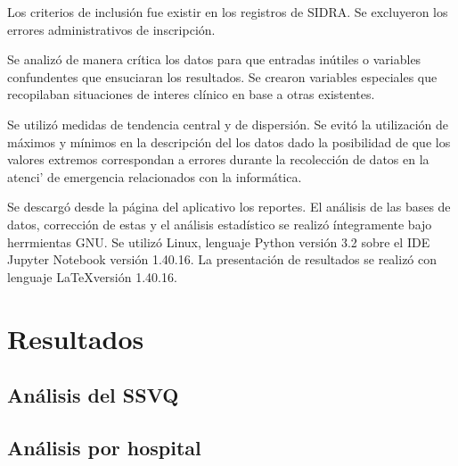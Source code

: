 \documentclass{article}
\begin{document}
Los criterios de inclusión fue existir en los registros de SIDRA. Se excluyeron los errores administrativos de inscripción.

Se analizó de manera crítica los datos para que entradas inútiles o variables confundentes que ensuciaran los resultados. Se crearon variables especiales que recopilaban situaciones de interes clínico en base a otras existentes.

Se utilizó medidas de tendencia central y de dispersión. Se evitó la utilización de máximos y mínimos en la descripción del los datos dado la posibilidad de que los valores extremos correspondan a errores durante la recolección de datos en la atenci' de emergencia relacionados con la informática.

Se descargó desde la página del aplicativo los reportes. El análisis de las bases de datos, corrección de estas y el análisis estadístico se realizó íntegramente bajo herrmientas GNU. Se utilizó Linux, lenguaje Python versión 3.2 sobre el IDE Jupyter Notebook versión 1.40.16. La presentación de resultados se realizó con lenguaje \LaTeX versión 1.40.16. 


\section{Resultados}



 
\subsection{Análisis del SSVQ}






\subsection{Análisis por hospital}










 
\end{document}
